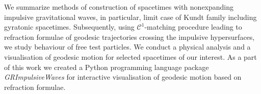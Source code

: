\documentclass[12pt]{report}
\begin{document}

We summarize methods of construction of spacetimes with nonexpanding impulsive gravitational waves,
in particular, limit case of Kundt family including gyratonic spacetimes. Subsequently, using
$\mathcal{C}^1$-matching procedure leading to refraction formulae of geodesic trajectories crossing the impulsive hypersurfaces,
we study behaviour of free test particles.
We conduct a physical analysis and a visualisation of geodesic motion for selected spacetimes of our interest.
As a part of this work we created a Python programming language package \emph{GRImpulsiveWaves} for
interactive visualisation of geodesic motion based on refraction formulae.
\end{document}
